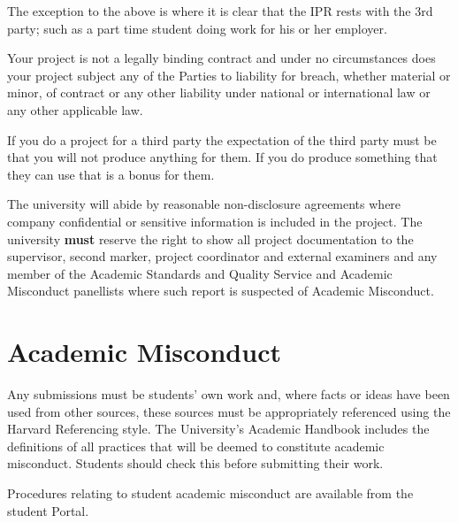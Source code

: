 The exception to the above is where it is clear that the IPR rests with the 3rd party; such as a part time student doing work for his or her employer.

\begin{tcolorbox}
    Your project is not a legally binding contract and under no circumstances does your project subject any of the Parties to liability for breach, whether material or minor, of contract or any other liability under national or international law or any other applicable law.
\end{tcolorbox}

If you do a project for a third party the expectation of the third party must be that you will not produce anything for them. If you do produce something that they can use that is a bonus for them.

The university will abide by reasonable non-disclosure agreements where company confidential or sensitive information is included in the project. The university \textbf{must} reserve the right to show all project documentation to the supervisor, second marker, project coordinator and external examiners and any member of the Academic Standards and Quality Service and Academic Misconduct panellists where such report is suspected of Academic Misconduct.

\section{Academic Misconduct}

Any submissions must be students’ own work and, where facts or ideas have been used from other sources, these sources must be appropriately referenced using the Harvard Referencing style. The University’s Academic Handbook includes the definitions of all practices that will be deemed to constitute academic misconduct. Students should check this before submitting their work.

Procedures relating to student academic misconduct are available from the student Portal.